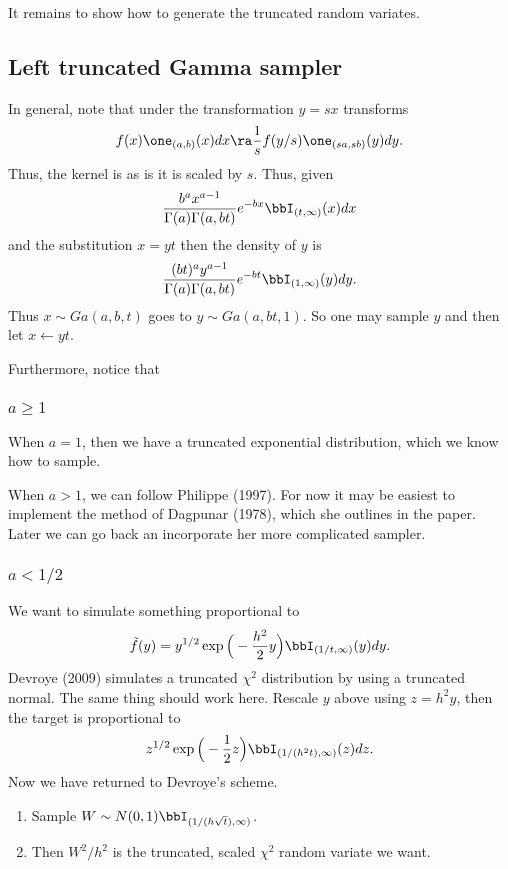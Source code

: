 \documentclass[12pt]{article}
\newcommand{\la}{\leftarrow}
\begin{document}
It remains to show how to generate the truncated random variates.

\subsection{Left truncated Gamma sampler}

In general, note that under the transformation $y = sx$ transforms
\[
f(x) \one_{(a,b)}(x) dx \ra \frac{1}{s} f(y/s) \one_{(sa,sb)}(y) dy.
\]
Thus, the kernel is as is it is scaled by $s$.  Thus, given
\[
\frac{b^a x^{a-1}}{\Gamma(a) \Gamma(a,bt)} e^{-bx} \bbI_{(t,\infty)}(x) dx
\]
and the substitution $x = yt$ then the density of $y$ is
\[
\frac{(bt)^a y^{a-1}}{\Gamma(a) \Gamma(a,bt)} e^{-bt} \bbI_{(1,\infty)}(y) dy.
\]
Thus $x \sim Ga(a,b,t)$ goes to $y \sim Ga(a,bt,1)$.  So one may sample $y$ and
then let $x \gets yt$.

Furthermore, notice that 

\subsubsection{$a \geq 1$}

When $a=1$, then we have a truncated exponential distribution, which we know how
to sample.

When $a > 1$, we can follow Philippe (1997).  For now it may be easiest to
implement the method of Dagpunar (1978), which she outlines in the paper.  Later
we can go back an incorporate her more complicated sampler.

\subsubsection{$a < 1/2$}

We want to simulate something proportional to
\[
\tilde f(y) = y^{1/2} \exp \Big( -\frac{h^2}{2} y \Big) \bbI_{(1/t,\infty)}(y) dy.
\]
Devroye (2009) simulates a truncated $\chi^2$ distribution by using a truncated
normal.  The same thing should work here.  Rescale $y$ above using $z = h^2y$,
then the target is proportional to
\[
z^{1/2} \exp \Big( -\frac{1}{2} z \Big) \bbI_{(1/(h^2 t), \infty)}(z) dz.
\]
Now we have returned to Devroye's scheme.  
\begin{enumerate}
\item Sample $W \sim N(0,1) \bbI_{(1/(h\sqrt{t}),\infty)}$.  

\item Then $W^2 / h^2$ is the truncated, scaled $\chi^2$ random variate we want.
\end{enumerate}
\end{document}

